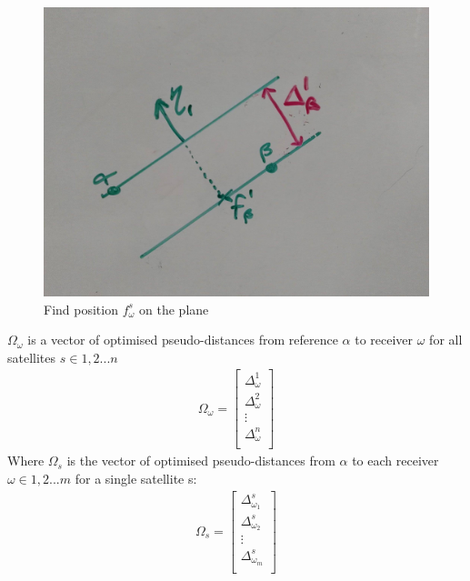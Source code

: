 \begin{figure}[h]
\centering
\caption{Find position $f_\omega^s$ on the plane}
\label{fig:pointonplane}
\includegraphics[width=0.7\linewidth]{ChapterPerception/Figures/pointonplane}
\end{figure}






$\Omega_\omega$ is a vector of optimised pseudo-distances from reference $\alpha$ to receiver $\omega$ for all satellites $s\in{1,2...n}$
\begin{eqnarray}
\Omega_\omega = \begin{bmatrix}
\Delta_{\omega}^1 \\
\Delta_{\omega}^2 \\
\vdots\\
\Delta_{\omega}^n \\
\end{bmatrix}
\end{eqnarray}
Where $\Omega_s$ is the vector of optimised pseudo-distances from $\alpha$ to each receiver $\omega\in1,2...m$ for a single satellite s:
\begin{eqnarray}
\Omega_s = \begin{bmatrix}
\Delta_{\omega_1}^s \\
\Delta_{\omega_2}^s \\
\vdots\\
\Delta_{\omega_m}^s \\
\end{bmatrix}
\end{eqnarray}


